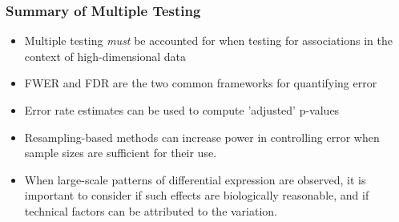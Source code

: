 \documentclass[xcolor=x11names,compress]{beamer}\usepackage[]{graphicx}\usepackage[]{color}
\begin{document}
\begin{frame}
\frametitle{Summary of Multiple Testing}
\begin{itemize}
  \item Multiple testing {\em must} be accounted for when testing for associations in the context of high-dimensional data
  \item FWER and FDR are the two common frameworks for quantifying error
   
  \item Error rate estimates can be used to compute 'adjusted' p-values
   
  \item Resampling-based methods can increase power in controlling error when sample sizes are sufficient
    for their use.
  \item When large-scale patterns of differential expression are observed, it is important to consider if 
    such effects are biologically reasonable, and if technical factors can be attributed to the variation.
      \end{itemize}

\end{frame}



  
  
\end{document}
